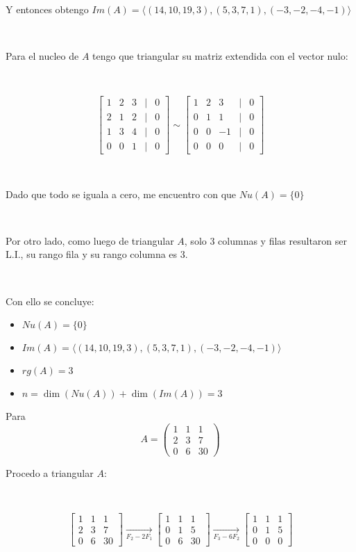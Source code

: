 \documentclass{article}
\begin{document}
\

\noindent Y entonces obtengo $Im(A) = \langle (14,10,19,3),(5,3,7,1),(-3,-2,-4,-1)\rangle$

\

\noindent Para el nucleo de $A$ tengo que triangular su matriz extendida con el vector nulo:

\

\[
\begin{bmatrix}
    1 & 2 & 3 & | & 0 \\
    2 & 1 & 2 & | & 0 \\
    1 & 3 & 4 & | & 0 \\
    0 & 0 & 1 & | & 0
\end{bmatrix}
\sim
\begin{bmatrix}
    1 & 2 & 3 & | & 0 \\
    0 & 1 & 1 & | & 0 \\
    0 & 0 & -1 & | & 0 \\
    0 & 0 & 0 & | & 0
\end{bmatrix}
\]

\

\noindent Dado que todo se iguala a cero, me encuentro con que $Nu(A) = \{0\}$

\

\noindent Por otro lado, como luego de triangular $A$, solo 3 columnas y filas resultaron ser L.I.,
su rango fila y su rango columna es 3.

\

Con ello se concluye:

\begin{itemize}
    \item $Nu(A) = \{0\}$ 
    \item $Im(A) = \langle (14,10,19,3),(5,3,7,1),(-3,-2,-4,-1)\rangle$ 
    \item $rg(A) = 3$
    \item $n = \dim(Nu(A)) + \dim(Im(A)) = 3$  
\end{itemize}

\newpage

\noindent Para \[A = \begin{pmatrix}
    1 & 1 & 1 \\
    2 & 3 & 7 \\
    0 & 6 & 30
\end{pmatrix}\]

\noindent Procedo a triangular $A$:


\

\[
\begin{bmatrix}
    1 & 1 & 1 \\
    2 & 3 & 7 \\
    0 & 6 & 30
\end{bmatrix}
\underset{F_2 - 2F_1}{\rightarrow}
\begin{bmatrix}
    1 & 1 & 1 \\
    0 & 1 & 5 \\
    0 & 6 & 30
\end{bmatrix}
\underset{F_3 - 6F_2}{\rightarrow}
\begin{bmatrix}
    1 & 1 & 1 \\
    0 & 1 & 5 \\
    0 & 0 & 0
\end{bmatrix}
\]
\end{document}
